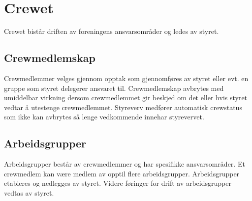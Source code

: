 \chapter{Crewet}
Crewet bistår driften av foreningens ansvarsområder og ledes av styret.

\section{Crewmedlemskap}
Crewmedlemmer velges gjennom opptak som gjennomføres av styret eller evt. en gruppe som styret delegerer ansvaret til. Crewmedlemskap avbrytes med umiddelbar virkning dersom crewmedlemmet gir beskjed om det eller hvis styret vedtar å utestenge crewmedlemmet. Styreverv medfører automatisk crewstatus som ikke kan avbrytes så lenge vedkommende innehar styrevervet.

\section{Arbeidsgrupper}
Arbeidsgrupper består av crewmedlemmer og har spesifikke ansvarsområder. Et crewmedlem kan være medlem av opptil flere arbeidsgrupper. Arbeidsgrupper etableres og nedlegges av styret. Videre føringer for drift av arbeidsgrupper vedtas av styret.
